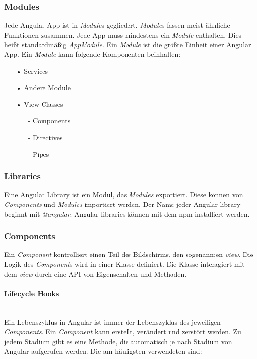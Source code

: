 
\subsubsection{Modules}
\label{sec:ang-modules}
Jede Angular App ist in \textit{Module}s gegliedert. \textit{Module}s fassen meist ähnliche Funktionen zusammen. Jede App muss mindestens ein \textit{Module} enthalten. Dies heißt standardmäßig \textit{AppModule}. Ein \textit{Module} ist die größte Einheit einer Angular App.  Ein \textit{Module} kann folgende Komponenten beinhalten:

\begin{itemize}
\item[•]Services
\item[•]Andere Module
\item[•]View Classes
\begin{itemize}
\item[-]Components
\item[-]Directives
\item[-]Pipes
\end{itemize}
\end{itemize}

\subsubsection{Libraries}
\label{sec:ang-libraries}
Eine Angular Library ist ein Modul, das \textit{Modules} exportiert. Diese können von \textit{Components} und \textit{Modules} importiert werden. Der Name jeder Angular library beginnt mit \textit{@angular}. Angular libraries können mit dem \ac{npm} installiert werden.

\subsubsection{Components}
\label{sec:ang-components}
Ein \textit{Component} kontrolliert einen Teil des Bildschirms, den sogenannten \textit{view}. Die Logik des \textit{Component}s wird in einer Klasse definiert. Die Klasse interagiert mit dem \textit{view} durch eine \ac{API} von Eigenschaften und Methoden.

\paragraph*{Lifecycle Hooks}\mbox{}\\
Ein Lebenszyklus in Angular ist immer der Lebenszyklus des jeweiligen \textit{Components}. Ein \textit{Component} kann erstellt, verändert und zerstört werden. Zu jedem Stadium gibt es eine Methode, die automatisch je nach Stadium von Angular aufgerufen werden. Die am häufigsten verwendeten sind:

